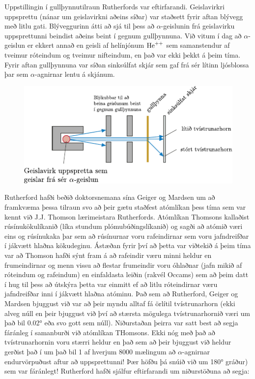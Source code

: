 \ifdefined \wholebook \else\documentclass[oneside]{book}\usepackage{EdlBook}\graphicspath{{figures/}}
\begin{document}
Uppstillingin í gullþynnutilraun Rutherfords var eftirfarandi. Geislavirkri uppsprettu (nánar um geislavirkni aðeins síðar) var staðsett fyrir aftan blývegg með litlu gati. Blýveggurinn átti að sjá til þess að $\alpha$-geislunin frá geislavirku uppsprettunni beindist aðeins beint í gegnum gullþynnuna. Við vitum í dag að $\alpha$-geislun er ekkert annað en geisli af helínjónum $\ce{He^++}$ sem samanstendur af tveimur róteindum og tveimur nifteindum, en það var ekki þekkt á þeim tíma. Fyrir aftan gullþynnuna var síðan sinksúlfat skjár sem gaf frá sér lítinn ljósblossa þar sem $\alpha$-agnirnar lentu á skjánum.

\begin{figure}[H]
    \centering
    \includegraphics{figures/rutherford-gold.pdf}
\end{figure}

Rutherford hafði beðið doktorsnemana sína Geiger og Mardsen um að framkvæma þessa tilraun svo að þeir gætu staðfest atómlíkan þess tíma sem var kennt við J.J. Thomson lærimeistara Rutherfords. Atómlíkan Thomsons kallaðist rúsínukökulíkanið (líka stundum plómubúðingslíkanið) og sagði að atómið væri eins og rúsínukaka þar sem að rúsínurnar voru rafeindirnar sem voru jafndreifðar í jákvætt hlaðna kökudeginu. Ástæðan fyrir því að þetta var viðtekið á þeim tíma var að Thomson hafði sýnt fram á að rafeindir væru minni heldur en frumeindirnar og menn vissu að flestar frumeindir voru óhlaðnar (jafn mikið af róteindum og rafeindum) en einfaldasta leiðin (rakvél Occams) sem að þeim datt í hug til þess að útskýra þetta var einmitt ef að litlu róteindirnar væru jafndreifðar inni í jákvætt hlaðna atóminu. Það sem að Rutherford, Geiger og Mardsen bjuggust við var að þeir myndu alltaf fá örlítil tvístrunarhorn (ekki alveg núll en þeir bjuggust við því að stærsta mögulega tvístrunarhornið væri um það bil \ang{0.02} eða svo gott sem núll). Niðurstaðan þeirra var satt best að segja fáránleg í samanburði við atómlíkan THomsons. Ekki nóg með það að tvístrunarhornin voru stærri heldur en það sem að þeir bjuggust við heldur gerðist það í um það bil 1 af hverjum 8000 mælingum að $\alpha$-agnirnar endurvörpuðust aftur að uppsprettunni! Þær höfðu þá snúið við um \ang{180} gráður) sem var fáránlegt! Rutherford hafði sjálfur eftirfarandi um niðurstöðuna að segja:
\end{document}
